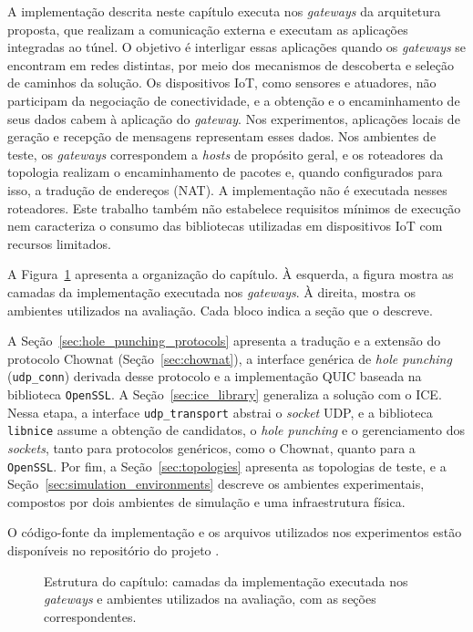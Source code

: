 A implementação descrita neste capítulo executa nos \textit{gateways} da arquitetura proposta, que realizam a comunicação externa e executam as aplicações integradas ao túnel. O objetivo é interligar essas aplicações quando os \textit{gateways} se encontram em redes distintas, por meio dos mecanismos de descoberta e seleção de caminhos da solução. Os dispositivos IoT, como sensores e atuadores, não participam da negociação de conectividade, e a obtenção e o encaminhamento de seus dados cabem à aplicação do \textit{gateway}. Nos experimentos, aplicações locais de geração e recepção de mensagens representam esses dados. Nos ambientes de teste, os \textit{gateways} correspondem a \textit{hosts} de propósito geral, e os roteadores da topologia realizam o encaminhamento de pacotes e, quando configurados para isso, a tradução de endereços (NAT). A implementação não é executada nesses roteadores. Este trabalho também não estabelece requisitos mínimos de execução nem caracteriza o consumo das bibliotecas utilizadas em dispositivos IoT com recursos limitados.

A Figura~\ref{fig:chapter_structure} apresenta a organização do capítulo. À esquerda, a figura mostra as camadas da implementação executada nos \textit{gateways}. À direita, mostra os ambientes utilizados na avaliação. Cada bloco indica a seção que o descreve.

A Seção~\ref{sec:hole_punching_protocols} apresenta a tradução e a extensão do protocolo Chownat (Seção~\ref{sec:chownat}), a interface genérica de \textit{hole punching} (\texttt{udp\_conn}) derivada desse protocolo e a implementação QUIC baseada na biblioteca \texttt{OpenSSL}. A Seção~\ref{sec:ice_library} generaliza a solução com o ICE. Nessa etapa, a interface \texttt{udp\_transport} abstrai o \textit{socket} UDP, e a biblioteca \texttt{libnice} assume a obtenção de candidatos, o \textit{hole punching} e o gerenciamento dos \textit{sockets}, tanto para protocolos genéricos, como o Chownat, quanto para a \texttt{OpenSSL}. Por fim, a Seção~\ref{sec:topologies} apresenta as topologias de teste, e a Seção~\ref{sec:simulation_environments} descreve os ambientes experimentais, compostos por dois ambientes de simulação e uma infraestrutura física.

O código-fonte da implementação e os arquivos utilizados nos experimentos estão disponíveis no repositório do projeto \citep{menezes2026chownice}.

\begin{figure}[ht]
\centering

\caption{Estrutura do capítulo: camadas da implementação executada nos \textit{gateways} e ambientes utilizados na avaliação, com as seções correspondentes.}
\label{fig:chapter_structure}
\end{figure}

